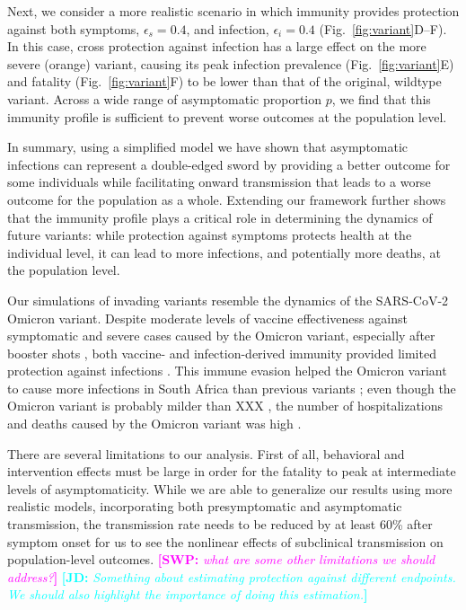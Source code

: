 \documentclass[12pt]{article}
\newcommand{\comment}{\showcomment}
\newcommand{\showcomment}[3]{\textcolor{#1}{\textbf{[#2: }\textsl{#3}\textbf{]}}}
\newcommand{\jd}[1]{\comment{cyan}{JD}{#1}}
\newcommand{\swp}[1]{\comment{magenta}{SWP}{#1}}
\newcommand{\fref}[1]{Fig.~\ref{fig:#1}}
\begin{document}
Next, we consider a more realistic scenario in which immunity provides protection against both symptoms, $\epsilon_s = 0.4$, and infection, $\epsilon_i = 0.4$ (\fref{variant}D--F).
In this case, cross protection against infection has a large effect on the more severe (orange) variant, causing its peak infection prevalence (\fref{variant}E) and fatality (\fref{variant}F) to be lower than that of the original, wildtype variant.
Across a wide range of asymptomatic proportion $p$, we find that this immunity profile is sufficient to prevent worse outcomes at the population level.

In summary, using a simplified model we have shown that asymptomatic infections can represent a double-edged sword by providing a better outcome for some individuals while facilitating onward transmission that leads to a worse outcome for the population as a whole.
Extending our framework further shows that the immunity profile plays a critical role in determining the dynamics of future variants:
while protection against symptoms protects health at the individual level, it can lead to more infections, and potentially more deaths, at the population level.

Our simulations of invading variants resemble the dynamics of the SARS-CoV-2 Omicron variant.
Despite moderate levels of vaccine effectiveness against symptomatic and severe cases caused by the Omicron variant, especially after booster shots \citep{andres2022omicron}, both vaccine- and infection-derived immunity provided limited protection against infections \citep{pearson2021omicron}.
This immune evasion helped the Omicron variant to cause more infections in South Africa than previous variants \citep{sun2022omicron};
even though the Omicron variant is probably milder than XXX \citep{MENNI20221618,ulloa2022estimates}, the number of hospitalizations and deaths caused by the Omicron variant was high \citep{Iacobuccio254,faust2022omicron,sigal2022estimating}.

There are several limitations to our analysis.
First of all, behavioral and intervention effects must be large in order for the fatality to peak at intermediate levels of asymptomaticity.
While we are able to generalize our results using more realistic models, incorporating both presymptomatic and asymptomatic transmission, the transmission rate needs to be reduced by at least 60\% after symptom onset for us to see the nonlinear effects of subclinical transmission on population-level outcomes.
\swp{what are some other limitations we should address?}
\jd{Something about estimating protection against different endpoints. We should also highlight the importance of doing this estimation.}
\end{document}
